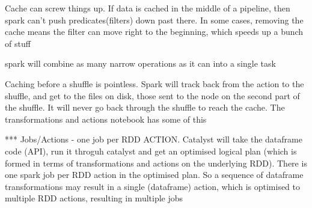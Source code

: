 \documentclass{article}
\begin{document}
Cache can screw things up. If data is cached in the middle of a pipeline, then spark can't push predicates(filters) down past there. In some cases, removing the cache means the filter can move right to the beginning, which speeds up a bunch of stuff

spark will combine as many narrow operations as it can into a single task

Caching before a shuffle is pointless. Spark will track back from the action to the shuffle, and get to the files on disk, those sent to the node on the second part of the shuffle. It will never go back through the shuffle to reach the cache. The transformations and actions notebook has some of this

*** Jobs/Actions - one job per RDD ACTION. Catalyst will take the dataframe code (API), run it throguh catalyst and get an optimised logical plan (which is formed in terms of transformations and actions on the underlying RDD). There is one spark job per RDD action in the optimised plan. So a sequence of dataframe transformations may result in a single (dataframe) action, which is optimised to multiple RDD actions, resulting in multiple jobs
\end{document}
